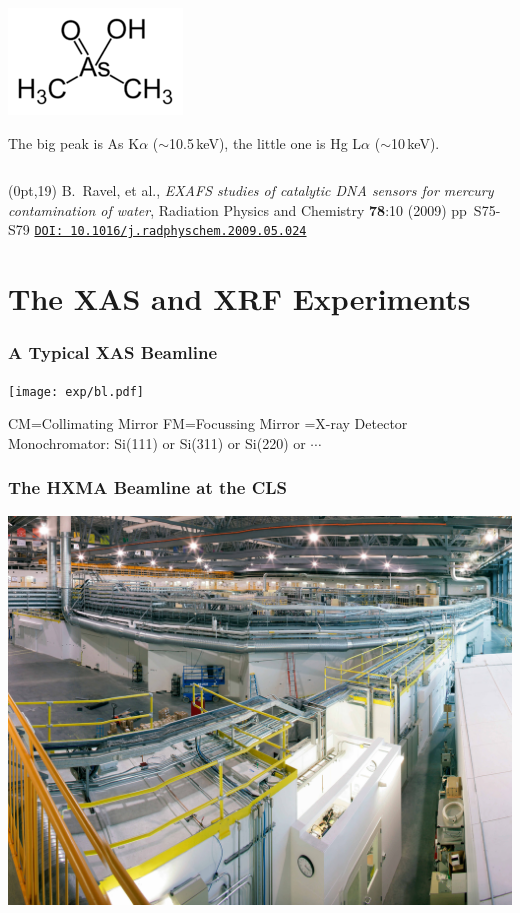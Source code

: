 \documentclass[10pt, xcolor=x11names, compress]{beamer}
\begin{document}
\begin{frame}
\begin{columns}
\begin{column}{0.5\linewidth}
\begin{center}
{          \includegraphics[width=0.35\linewidth]{images/cacodylate.png}

          \small
          The big peak is As K$\alpha$ ($\sim$10.5\,keV), the little one is
          Hg L$\alpha$ ($\sim$10\,keV).
        }
      \end{center}
    \end{column}
  \end{columns}
  \begin{textblock*}{0.5\linewidth}(0pt,19\TPVertModule)%
    \tiny%
    B.\ Ravel, et al., \textit{EXAFS studies of catalytic DNA sensors
      for mercury contamination of water}, Radiation Physics and
    Chemistry \textbf{78}:10 (2009) pp\ S75-S79
    \href{http://dx.doi.org/10.1016/j.radphyschem.2009.05.024}
    {\color{Blue4}\texttt{DOI: 10.1016/j.radphyschem.2009.05.024}}
  \end{textblock*}
\end{frame}

\section[Experiment]{The XAS and XRF Experiments}

\begin{frame}
  \frametitle{A Typical XAS Beamline}

  \begin{center}
    \texttt{[image: exp/bl.pdf]}

    CM=Collimating Mirror \quad FM=Focussing Mirror
    \quad {\color{Green4}$\Box$}=X-ray Detector\\
    Monochromator: Si(111) or Si(311) or Si(220) or $\cdots$
  \end{center}
\end{frame}
\begin{frame}
  \frametitle{The HXMA Beamline at the CLS}
  \begin{center}
    \includegraphics[width=0.8\linewidth]{exp/hxma.jpg}
  \end{center}
\end{frame}
\end{document}
